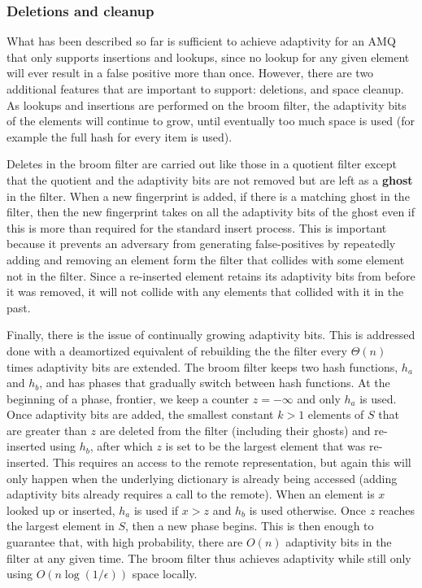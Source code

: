 \documentclass[../paper.tex]{subfiles}
\begin{document}
\subsubsection{Deletions and cleanup}

What has been described so far is sufficient to achieve adaptivity for an AMQ that
only supports insertions and lookups, since no lookup for any given element will
ever result in a false positive more than once. However, there are two additional
features that are important to support: deletions, and space cleanup. As lookups and
insertions are performed on the broom filter, the adaptivity bits of the elements will
continue to grow, until eventually too much space is used (for example the full hash
for every item is used).
     
Deletes in the broom filter are carried out like
those in a quotient filter except that the quotient and the adaptivity
bits are not removed but are left as a {\bf ghost} in the filter.  When a
new fingerprint is added, if there is a matching ghost in the filter, then
the new fingerprint takes on all the adaptivity bits of the ghost even  if
this is more than required for the standard insert process. 
This is important because it prevents an adversary from generating false-positives
by repeatedly adding and removing an element form the filter that collides with
some element not in the filter. Since a re-inserted element retains its
adaptivity bits from before it was removed, it will not collide with any
elements that collided with it in the past.

Finally, there is the issue of continually growing adaptivity bits.
This is addressed done with a deamortized equivalent of rebuilding the the filter
every $\Theta (n)$ times adaptivity bits are extended. The broom filter keeps
two hash functions, $h_a$ and $h_b$, and has phases that
gradually switch between hash functions.  At the beginning of a phase,
frontier, we keep a counter $z = -\infty$ and only $h_a$ is used.  Once adaptivity bits are
added, the smallest constant $k > 1$ elements of $S$ that are greater than
$z$ are deleted from the filter (including their ghosts) and re-inserted
using $h_b$, after which $z$ is set to be the largest element that was
re-inserted.  This requires an access to the remote representation, but
again this will only happen when the underlying dictionary is already
being accessed (adding adaptivity bits already requires a call to the remote).
When an element is $x$ looked up or inserted, $h_a$ is
used if $x > z$ and $h_b$ is used otherwise.  Once $z$ reaches the largest
element in $S$, then a new phase begins.  This is then enough to guarantee
that, with high probability, there are $O(n)$ adaptivity bits in the
filter at any given time.  The broom filter thus achieves adaptivity while
still only using $O(n \log (1/\epsilon))$ space locally.  
\end{document}
